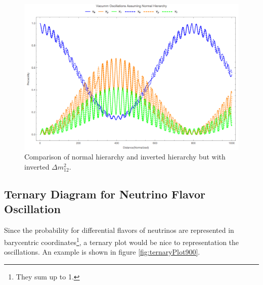 \documentclass{tufte-handout}
\begin{document}
\begin{figure}
\centering
\includegraphics{assets/vacOscNormInvComp-Invert12.png}
\caption{Comparison of normal hierarchy and inverted hierarchy but with inverted $\Delta m_{12}^2$.}
\label{fig:vacOscNormInvComp-Invert12}
\end{figure}




\subsection{Ternary Diagram for Neutrino Flavor Oscillation}

Since the probability for differential flavors of neutrinos are represented in barycentric coordinates\footnote{They sum up to 1.}, a ternary plot would be nice to representation the oscillations. An example is shown in figure \ref{fig:ternaryPlot900}.
\end{document}
